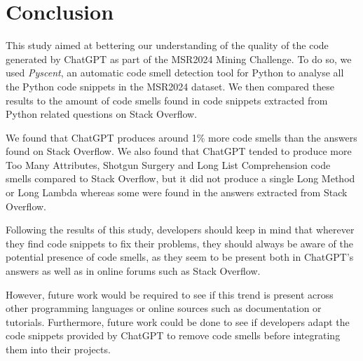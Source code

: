 
\section{Conclusion}
\label{sec:conclusion}
This study aimed at bettering our understanding of the quality of the code generated by ChatGPT as part of the MSR2024 Mining Challenge. To do so, we used \textit{Pyscent}, an automatic code smell detection tool for Python to analyse all the Python code snippets in the MSR2024 dataset. We then compared these results to the amount of code smells found in code snippets extracted from Python related questions on Stack Overflow.

We found that ChatGPT produces around 1\% more code smells than the answers found on Stack Overflow. We also found that ChatGPT tended to produce more Too Many Attributes, Shotgun Surgery and Long List Comprehension code smells compared to Stack Overflow, but it did not produce a single Long Method or Long Lambda whereas some were found in the answers extracted from Stack Overflow.

Following the results of this study, developers should keep in mind that wherever they find code snippets to fix their problems, they should always be aware of the potential presence of code smells, as they seem to be present both in ChatGPT's answers as well as in online forums such as Stack Overflow.

However, future work would be required to see if this trend is present across other programming languages or online sources such as documentation or tutorials. Furthermore, future work could be done to see if developers adapt the code snippets provided by ChatGPT to remove code smells before integrating them into their projects. \\